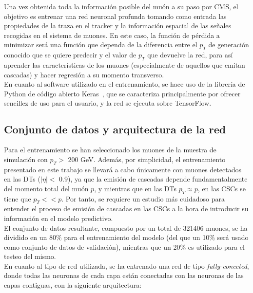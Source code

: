 
Una vez obtenida toda la informaci\'on posible del mu\'on a su paso por CMS, el objetivo es entrenar una red neuronal profunda tomando como entrada las propiedades de la traza en el tracker y la informaci\'on espacial de las se\~nales recogidas en el sistema de muones. En este caso, la funci\'on de p\'erdida a minimizar ser\'a una funci\'on que dependa de la diferencia entre el $p_{T}$ de generaci\'on conocido que se quiere predecir y el valor de $p_{T}$ que devuelve la red, para as\'i aprender las caracter\'isticas de los muones (especialmente de aquellos que emitan cascadas) y hacer regresi\'on a su momento transverso. \\

En cuanto al software utilizado en el entrenamiento, se hace uso de la librer\'ia de Python de c\'odigo abierto Keras~\cite{chollet2015keras}, que se caracteriza principalmente por ofrecer sencillez de uso para el usuario, y la red se ejecuta sobre TensorFlow. \\


\subsection{Conjunto de datos y arquitectura de la red}\label{sec:arch}

Para el entrenamiento se han seleccionado los muones de la muestra de simulaci\'on con $p_{T} > $ 200 GeV. Adem\'as, por simplicidad, el entrenamiento presentado en este trabajo se llevar\'a a cabo \'unicamente con muones detectados en las DTs ($\lvert \eta \rvert <$ 0.9), ya que la emisi\'on de cascadas depende fundamentalmente del momento total del mu\'on $p$, y mientras que en las DTs $p_{T} \approx p$, en las CSCs se tiene que $p_{T} << p$. Por tanto, se requiere un estudio m\'as cuidadoso para entender el proceso de emisi\'on de cascadas en las CSCs a la hora de introducir su informaci\'on en el modelo predictivo. \\

El conjunto de datos resultante, compuesto por un total de 321406 muones, se ha dividido en un 80\% para el entrenamiento del modelo (del que un 10\% ser\'a usado como conjunto de datos de validaci\'on), mientras que un 20\% es utilizado para el testeo del mismo. \\

En cuanto al tipo de red utilizada, se ha entrenado una red de tipo \textit{fully-conected}, donde todas las neuronas de cada capa est\'an conectadas con las neuronas de las capas contiguas, con la siguiente arquitectura:

